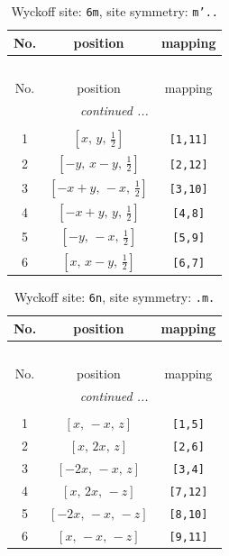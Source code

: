 \documentclass[fleqn,8pt]{jsarticle}
\begin{document}
\renewcommand{\arraystretch}{1.2}
\begin{longtable}{ccc}
\caption{Wyckoff site: {\tt 6m}, site symmetry: {\tt m'..}}
 \\
 \hline \hline
No. & position & mapping \\ \hline \endfirsthead

\multicolumn{2}{l}{\tablename\ \thetable{}} \\
 \hline \hline
No. & position & mapping \\ \hline \endhead

 \hline \hline
\multicolumn{2}{r}{\footnotesize\it continued ...} \\ \endfoot

 \hline \hline
\multicolumn{2}{r}{} \\ \endlastfoot

1 & $\left[ x,\, y,\, \frac{1}{2} \right]$ & {\tt [1,11]} \\ \hline
2 & $\left[ - y,\, x - y,\, \frac{1}{2} \right]$ & {\tt [2,12]} \\ \hline
3 & $\left[ - x + y,\, - x,\, \frac{1}{2} \right]$ & {\tt [3,10]} \\ \hline
4 & $\left[ - x + y,\, y,\, \frac{1}{2} \right]$ & {\tt [4,8]} \\ \hline
5 & $\left[ - y,\, - x,\, \frac{1}{2} \right]$ & {\tt [5,9]} \\ \hline
6 & $\left[ x,\, x - y,\, \frac{1}{2} \right]$ & {\tt [6,7]} \\
\end{longtable}
\renewcommand{\arraystretch}{1.2}
\begin{longtable}{ccc}
\caption{Wyckoff site: {\tt 6n}, site symmetry: {\tt .m.}}
 \\
 \hline \hline
No. & position & mapping \\ \hline \endfirsthead

\multicolumn{2}{l}{\tablename\ \thetable{}} \\
 \hline \hline
No. & position & mapping \\ \hline \endhead

 \hline \hline
\multicolumn{2}{r}{\footnotesize\it continued ...} \\ \endfoot

 \hline \hline
\multicolumn{2}{r}{} \\ \endlastfoot

1 & $\left[ x,\, - x,\, z \right]$ & {\tt [1,5]} \\ \hline
2 & $\left[ x,\, 2 x,\, z \right]$ & {\tt [2,6]} \\ \hline
3 & $\left[ - 2 x,\, - x,\, z \right]$ & {\tt [3,4]} \\ \hline
4 & $\left[ x,\, 2 x,\, - z \right]$ & {\tt [7,12]} \\ \hline
5 & $\left[ - 2 x,\, - x,\, - z \right]$ & {\tt [8,10]} \\ \hline
6 & $\left[ x,\, - x,\, - z \right]$ & {\tt [9,11]} \\
\end{longtable}
\end{document}
